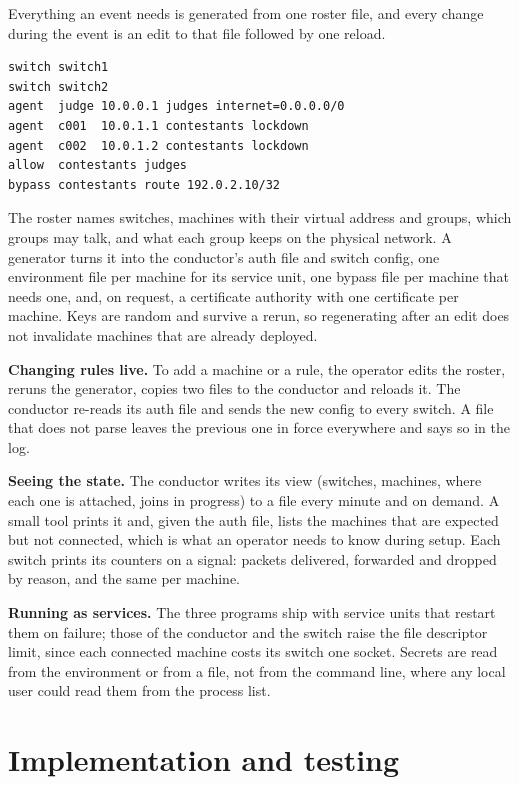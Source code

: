 \documentclass[11pt,a4paper]{article}
\begin{document}
Everything an event needs is generated from one roster file, and every change during the event is an edit to that file followed by one reload.

\begin{small}\begin{verbatim}
switch switch1
switch switch2
agent  judge 10.0.0.1 judges internet=0.0.0.0/0
agent  c001  10.0.1.1 contestants lockdown
agent  c002  10.0.1.2 contestants lockdown
allow  contestants judges
bypass contestants route 192.0.2.10/32
\end{verbatim}\end{small}

The roster names switches, machines with their virtual address and groups, which groups may talk, and what each group keeps on the physical network. A generator turns it into the conductor's auth file and switch config, one environment file per machine for its service unit, one bypass file per machine that needs one, and, on request, a certificate authority with one certificate per machine. Keys are random and survive a rerun, so regenerating after an edit does not invalidate machines that are already deployed.

\textbf{Changing rules live.} To add a machine or a rule, the operator edits the roster, reruns the generator, copies two files to the conductor and reloads it. The conductor re-reads its auth file and sends the new config to every switch. A file that does not parse leaves the previous one in force everywhere and says so in the log.

\textbf{Seeing the state.} The conductor writes its view (switches, machines, where each one is attached, joins in progress) to a file every minute and on demand. A small tool prints it and, given the auth file, lists the machines that are expected but not connected, which is what an operator needs to know during setup. Each switch prints its counters on a signal: packets delivered, forwarded and dropped by reason, and the same per machine.

\textbf{Running as services.} The three programs ship with service units that restart them on failure; those of the conductor and the switch raise the file descriptor limit, since each connected machine costs its switch one socket. Secrets are read from the environment or from a file, not from the command line, where any local user could read them from the process list.

\hypertarget{implementation-and-testing}{%
\section{Implementation and testing}\label{implementation-and-testing}}
\end{document}
